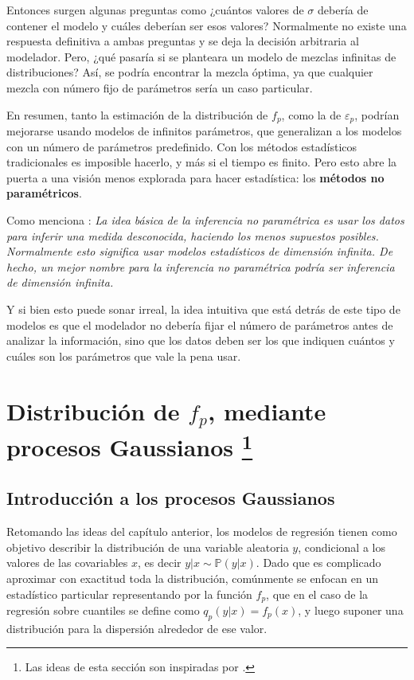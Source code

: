Entonces surgen algunas preguntas como ¿cu\'antos valores de $\sigma$ deber\'ia de contener el modelo y cu\'ales deber\'ian ser esos valores? Normalmente no existe una respuesta definitiva a ambas preguntas y se deja la decisi\'on arbitraria al modelador. Pero, ¿qu\'e pasar\'ia si se planteara un modelo de mezclas infinitas de distribuciones? As\'i, se podr\'ia encontrar la mezcla \'optima, ya que cualquier mezcla con n\'umero fijo de par\'ametros ser\'ia un caso particular.

En resumen, tanto la estimaci\'on de la distribuci\'on de $f_p$, como la de $\varepsilon_p$, podr\'ian mejorarse usando modelos de infinitos par\'ametros, que generalizan a los modelos con un n\'umero de par\'ametros predefinido. Con los m\'etodos estad\'isticos tradicionales es imposible hacerlo, y m\'as si el tiempo es finito. Pero esto abre la puerta a una visi\'on menos explorada para hacer estad\'istica: los \textbf{m\'etodos no param\'etricos}.

Como menciona \cite{Wasserman_Nonparametric}: \textit{La idea b\'asica de la inferencia no param\'etrica es usar los datos para inferir una medida desconocida, haciendo los menos supuestos posibles. Normalmente esto significa usar modelos estad\'isticos de dimensi\'on infinita. De hecho, un mejor nombre para la inferencia no param\'etrica podr\'ia ser inferencia de dimensi\'on infinita.}

Y si bien esto puede sonar irreal, la idea intuitiva que est\'a detr\'as de este tipo de modelos es que el modelador no deber\'ia fijar el n\'umero de par\'ametros antes de analizar la informaci\'on, sino que los datos deben ser los que indiquen cu\'antos y cu\'ales son los par\'ametros que vale la pena usar.

\section[Distribuci\'on de $f_p$, mediante procesos Gaussianos]{
    Distribuci\'on de $f_p$, mediante procesos Gaussianos
    \footnote{Las ideas de esta secci\'on son inspiradas por \cite{Rasmussen_GauProc}.}
}

\subsection{Introducci\'on a los procesos Gaussianos}

Retomando las ideas del cap\'itulo anterior, los modelos de regresi\'on tienen como objetivo describir la distribuci\'on de una variable aleatoria $y$, condicional a los valores de las covariables $x$, es decir $y|x \sim \mathbb{P}(y|x)$. Dado que es complicado aproximar con exactitud toda la distribuci\'on, com\'unmente se enfocan en un estad\'istico particular representando por la funci\'on $f_p$, que en el caso de la regresi\'on sobre cuantiles se define como $q_p(y|x) = f_p(x)$, y luego suponer una distribuci\'on para la dispersi\'on alrededor de ese valor.

